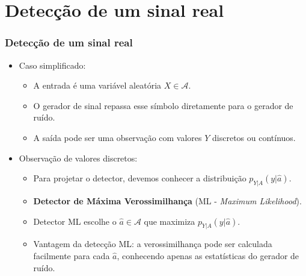\section{Detecção de um sinal real}

\begin{frame}
	\frametitle{Detecção de um sinal real}

	\begin{itemize}
	    \item Caso simplificado:
	    \begin{itemize}
	      \item A entrada é uma variável aleatória $X \in \mathcal{A}$.
	      \item O gerador de sinal repassa esse símbolo diretamente para o gerador de ruído.
	      \item A saída pode ser uma observação com valores $Y$ discretos ou contínuos.
	    \end{itemize}
	    \item Observação de valores discretos:
	    \begin{itemize}
	      \item Para projetar o detector, devemos conhecer a distribuição $p_{Y|A}(y|\hat{a})$.
	      \item \textbf{Detector de Máxima Verossimilhança} (ML - \textit{Maximum Likelihood}).
	      \item Detector ML escolhe o $\hat{a}\in \mathcal{A}$ que maximiza $p_{Y|A}(y|\hat{a})$.
	      \item Vantagem da detecção ML: a verossimilhança pode ser calculada facilmente para cada $\hat{a}$, conhecendo apenas as estatísticas do gerador de ruído.
	    \end{itemize}
	\end{itemize}			
\end{frame}

